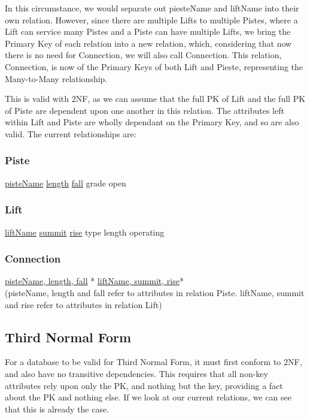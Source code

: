 \documentclass[11pt]{scrartcl} %
\begin{document}
In this circumstance, we would separate out piesteName and liftName into their own relation. However, since there are multiple Lifts to multiple Pistes, where a Lift can service many Pistes and a Piste can have multiple Lifts, we bring the Primary Key of each relation into a new relation, which, considering that now there is no need for Connection, we will also call Connection. This relation, Connection, is now of the Primary Keys of both Lift and Pieste, representing the Many-to-Many relationship.

This is valid with 2NF, as we can assume that the full PK of Lift and the full PK of Piste are dependent upon one another in this relation. The attributes left within Lift and Piste are wholly dependant on the Primary Key, and so are also valid. The current relationships are:

\subsubsection{Piste}
\underline{pisteName}\newline
\underline{length}\newline
\underline{fall}\newline
grade\newline
open

\subsubsection{Lift}
\underline{liftName}\newline
\underline{summit}\newline
\underline{rise}\newline
type\newline
length\newline
operating

\subsubsection{Connection}
\underline{pisteName, length, fall} *\newline
\underline{liftName, summit, rise}*\\[0.2cm]
(pisteName, length and fall refer to attributes in relation Piste. liftName, summit and rise refer to attributes in relation Lift)

\subsection{Third Normal Form}
For a database to be valid for Third Normal Form, it must first conform to 2NF, and also have no transitive dependencies. This requires that all non-key attributes rely upon only the PK, and nothing but the key, providing a fact about the PK and nothing else. If we look at our current relations, we can see that this is already the case.
\end{document}
